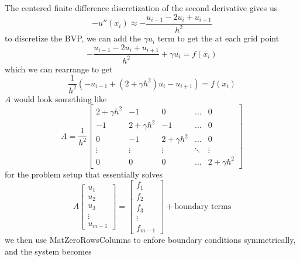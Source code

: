 \documentclass[12pt]{article}
\begin{document}
The centered finite difference discretization of the second derivative gives us
\begin{equation}
    -u''(x_i) \approx -\dfrac{u_{i-1} - 2u_i + u_{i+1}}{h^2}
\end{equation}
to discretize the BVP, we can add the $\gamma u_i$ term to get the at each grid point 
\begin{equation}
    -\dfrac{u_{i-1} - 2u_i + u_{i+1}}{h^2} + \gamma u_i = f(x_i)
\end{equation}
which we can rearrange to get
\begin{equation}
    \dfrac{1}{h^2}(-u_{i-1} + (2 + \gamma h^2) u_i - u_{i+1}) = f(x_i) 
\end{equation}
$A$ would look something like
\begin{equation}
    A = \dfrac{1}{h^2} \begin{bmatrix}
    2 + \gamma h^2 & -1 & 0 & \ldots & 0 \\
    -1 & 2 + \gamma h^2 & -1 & \ldots & 0 \\
    0 & -1 & 2 + \gamma h^2 & \ldots & 0 \\
    \vdots & \vdots & \vdots & \ddots & \vdots \\
    0 & 0 & 0 & \ldots & 2 + \gamma h^2
    \end{bmatrix}
\end{equation}
for the problem setup that essentially solves
\begin{equation}
    A \begin{bmatrix} u_1 \\ u_2 \\ u_3 \\ \vdots \\ u_{m-1} \end{bmatrix} = \begin{bmatrix} f_1 \\ f_2 \\ f_3 \\ \vdots \\ f_{m-1} \end{bmatrix} + \text{boundary terms}
\end{equation}
we then use MatZeroRowsColumns to enfore boundary conditions symmetrically, and the system becomes 
\end{document}
